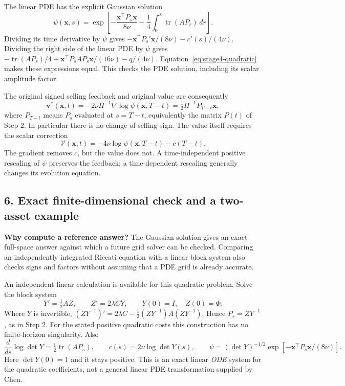 The linear PDE has the explicit Gaussian solution
\begin{equation}
 \psi(\mathbf x,s)=\exp\left[-\frac{\mathbf x^\top P_s\mathbf x}{8\nu}
 -\frac14\int_0^s\operatorname{tr}(AP_r)\,dr\right].
 \label{eq:stage4-gaussian}
\end{equation}
Dividing its time derivative by $\psi$ gives
$-\mathbf x^\top P_s'\mathbf x/(8\nu)-c'(s)/(4\nu)$.
Dividing the right side of the linear PDE by $\psi$ gives
$-\operatorname{tr}(AP_s)/4+
\mathbf x^\top P_sAP_s\mathbf x/(16\nu)-q/(4\nu)$.
Equation~\eqref{eq:stage4-quadratic} makes these expressions equal.
This checks the PDE solution, including its scalar amplitude factor.

The original signed selling feedback and original value are consequently
\begin{equation}
 \boxed{\mathbf v^*(\mathbf x,t)
 =-2\nu H^{-1}\nabla\log\psi(\mathbf x,T-t)
 =\tfrac12H^{-1}P_{T-t}\mathbf x,}
 \label{eq:recovery}
\end{equation}
where $P_{T-t}$ means $P_s$ evaluated at $s=T-t$, equivalently
the matrix $P(t)$ of Step 2. In particular there is no change of selling
sign. The value itself requires the scalar correction
\begin{equation}
 \boxed{\mathcal V(\mathbf x,t)
 =-4\nu\log\psi(\mathbf x,T-t)-c(T-t).}
 \label{eq:stage4-value-recovery}
\end{equation}
The gradient removes $c$, but the value does not. A time-independent
positive rescaling of $\psi$ preserves the feedback; a time-dependent
rescaling generally changes its evolution equation.

\subsection*{6. Exact finite-dimensional check and a two-asset example}

\textbf{Why compute a reference answer?} The Gaussian solution gives an
exact full-space answer against which a future grid solver can be checked.
Comparing an independently integrated Riccati equation with a linear block
system also checks signs and factors without assuming that a PDE grid is
already accurate.

An independent linear calculation is available for this quadratic
problem. Solve the block system
\begin{equation}
 Y'=\tfrac12AZ,\qquad Z'=2\lambda CY,\qquad
 Y(0)=I,\quad Z(0)=\Phi.
 \label{eq:stage4-block}
\end{equation}
Where $Y$ is invertible,
$(ZY^{-1})'=2\lambda C-\tfrac12(ZY^{-1})A(ZY^{-1})$.
Hence $P_s=ZY^{-1}$, as in Step 2. For the stated positive quadratic
costs this construction has no finite-horizon singularity. Also
\[
 \frac{d}{ds}\log\det Y=\tfrac12\operatorname{tr}(AP_s),\qquad
 c(s)=2\nu\log\det Y(s),\qquad
 \psi=(\det Y)^{-1/2}
       \exp[-\mathbf x^\top P_s\mathbf x/(8\nu)].
\]
Here $\det Y(0)=1$ and it stays positive. This is an exact linear
\emph{ODE} system for the quadratic coefficients, not a general linear
PDE transformation supplied by Chen.

